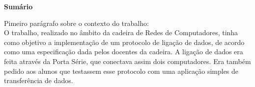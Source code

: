 \documentclass[a4paper, 11pt]{article}
\begin{document}
\maketitle
\thispagestyle{empty}


\newpage

%
%
%
%
%
%
%

\Huge\textbf{Sumário}\linebreak\linebreak
\normalsize 

Pimeiro parágrafo sobre o contexto do trabalho:\\
O trabalho, realizado no âmbito da cadeira de Redes de Computadores, tinha como objetivo a implementação de um protocolo de ligação de dados, de acordo como uma especificação dada pelos docentes da cadeira. A ligação de dados era feita através da Porta Série, que conectava assim dois computadores.
Era também pedido aos alunos que testassem esse protocolo com uma aplicação simples de transferência de dados.
\end{document}
